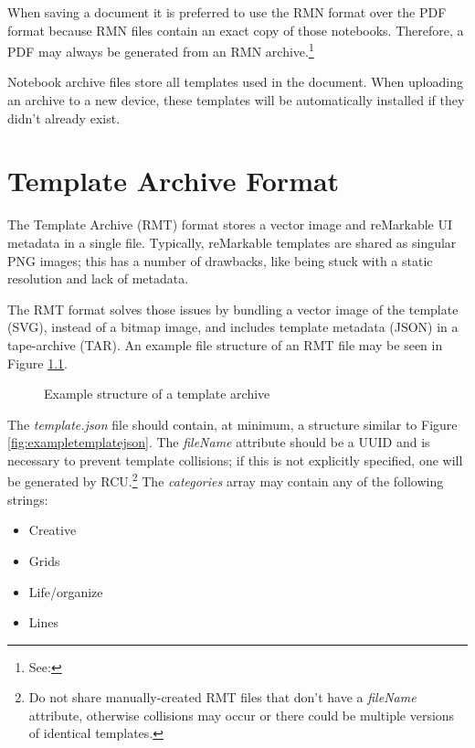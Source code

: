 \documentclass{memoir}
\begin{document}
{When saving a document it is preferred to use the RMN format over the PDF format because RMN files contain an exact copy of those notebooks. Therefore, a PDF may always be generated from an RMN archive.\footnote{See: }

Notebook archive files store all templates used in the document. When uploading an archive to a new device, these templates will be automatically installed if they didn't already exist.


\chapter{Template Archive Format}
\label{sec:templatearchiveformat}
The Template Archive (RMT) format stores a vector image and reMarkable UI metadata in a single file. Typically, reMarkable templates are shared as singular PNG images; this has a number of drawbacks, like being stuck with a static resolution and lack of metadata.

The RMT format solves those issues by bundling a vector image of the template (SVG), instead of a bitmap image, and includes template metadata (JSON) in a tape-archive (TAR). An example file structure of an RMT file may be seen in Figure \ref{fig:rmtstructure}.

\begin{figure}[h]
\caption{Example structure of a template archive}
\label{fig:rmtstructure}
\end{figure}

The \textit{template.json} file should contain, at minimum, a structure similar to Figure \ref{fig:exampletemplatejson}. The \textit{fileName} attribute should be a UUID and is necessary to prevent template collisions; if this is not explicitly specified, one will be generated by RCU.\footnote{Do not share manually-created RMT files that don't have a \textit{fileName} attribute, otherwise collisions may occur or there could be multiple versions of identical templates.} The \textit{categories} array may contain any of the following strings:

\begin{itemize}
\item{Creative}
\item{Grids}
\item{Life/organize}
\item{Lines}
\end{itemize}


}
\end{document}

